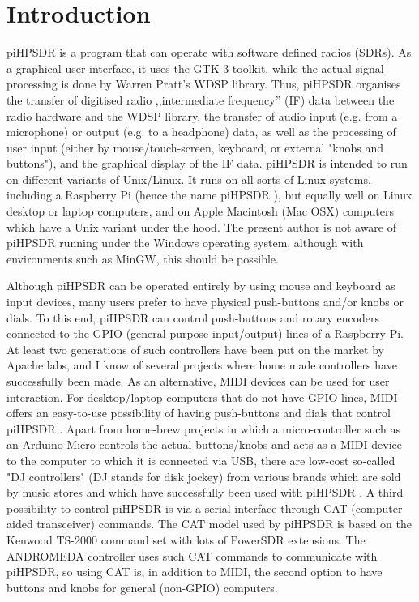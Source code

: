 \documentclass[12pt]{book}
\def\pH{pi\-HPSDR }
\begin{document}
\chapter{Introduction}
\pH is a program that can operate with software defined radios (SDRs). As a graphical user interface,
it uses the GTK-3 toolkit, while the actual signal processing is done by Warren Pratt's WDSP library. Thus,
\pH organises the transfer of digitised radio ,,intermediate frequency'' (IF)
data between the radio hardware and the
WDSP library, the
transfer of audio input (e.g. from a microphone) or output (e.g. to a headphone) data,
 as well as the processing of user
input (either by mouse/touch-screen, keyboard, or external "knobs and buttons"),
 and the graphical display of the IF data. \pH is intended
to run on different variants of Unix/Linux. It runs on all sorts of Linux systems,
including a Raspberry Pi (hence
the name \pH), but equally well on Linux desktop or laptop computers, and on Apple Macintosh (Mac OSX)
computers which have a Unix variant under the hood. The present author is not aware of \pH running
under the Windows operating system, although with environments such as MinGW, this should be possible.

Although \pH can be operated entirely by using mouse and keyboard as input devices, many users prefer to
have physical push-buttons and/or knobs or dials. To this end, \pH can control push-buttons and rotary
encoders connected to the GPIO (general purpose input/output)
lines of a Raspberry Pi. At least two generations of such controllers have
been put on the market by Apache labs, and I know of several projects where home made controllers have
successfully been made. As an alternative, MIDI devices can be used for user interaction. For desktop/laptop
computers that do not have GPIO lines, MIDI offers an easy-to-use possibility of having push-buttons and
dials that control \pH. Apart from home-brew projects in which a micro-controller such as an Arduino
Micro controls the actual buttons/knobs and acts as a MIDI device to the computer to which it is connected
via USB, there are low-cost so-called "DJ controllers" (DJ stands for disk jockey) from various brands
which are sold by music stores and
which
have successfully been used with \pH. A third possibility to control \pH is via a serial interface
through CAT (computer aided transceiver) commands. The CAT model used by \pH is based on the Kenwood
TS-2000 command set with lots of PowerSDR extensions. The ANDROMEDA controller uses such CAT commands to
communicate with piHPSDR, so using CAT is, in addition to MIDI, the second option to have buttons and knobs
for general (non-GPIO) computers.
\end{document}
